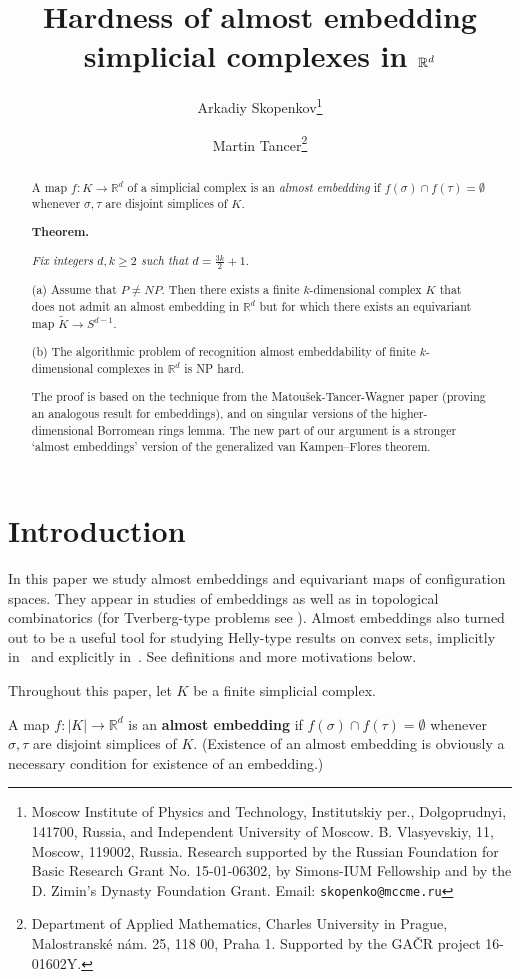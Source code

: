 \documentclass[runningheads]{llncs}
\title{Hardness of almost embedding simplicial complexes in $\R^d$
}
\author{Arkadiy Skopenkov\thanks{Moscow Institute of Physics and Technology,
  Institutskiy per., Dolgoprudnyi, 141700, Russia,
  and Independent University of Moscow.
  B. Vlasy\-ev\-skiy, 11, Moscow, 119002, Russia. Research supported by the
  Russian Foundation for Basic Research Grant No. 15-01-06302, by Simons-IUM Fellowship and by the D. Zimin's Dynasty Foundation Grant.
  Email:
  \texttt{skopenko@mccme.ru}} \and Martin Tancer\thanks{
Department of Applied Mathematics, Charles University in Prague, Malostransk\'e n\'am. 25, 118 00,
Praha 1. Supported by the GA\v{C}R project 16-01602Y.
}}
\date{}
\newcommand{\red}[1]{\begingroup\color{red}#1\endgroup}
\theoremstyle{remark}
\theoremstyle{definition}
\newcommand{\R}{\mathbb{R}}
\def\t{\widetilde}
\begin{document}
\maketitle

\begin{abstract}
A map $f\colon K\to \R^d$ of a simplicial complex is an \emph{almost embedding} if $f(\sigma)\cap f(\tau)=\emptyset$ whenever $\sigma,\tau$ are disjoint simplices of $K$.

{\bf Theorem.} {\it Fix integers $d,k\ge2$ such that $d=\frac{3k}2+1$.

(a) Assume that $P\ne NP$.
Then there exists a finite $k$-dimensional complex $K$ that does not admit an almost embedding in $\R^d$ but for which there exists an equivariant map $\t K\to S^{d-1}$.

(b) The algorithmic problem of recognition almost embeddability of finite $k$-dimensional complexes in $\R^d$ is NP hard.}

The proof is based on the technique from the Matou\v{s}ek-Tancer-Wagner paper (proving an analogous result for
embeddings), and on singular versions of the higher-dimensional {B}orromean rings lemma. The new part of our argument is a stronger `almost embeddings' version of the generalized van Kampen--Flores theorem.
\end{abstract}

\tableofcontents





\section{Introduction}

In this paper we study almost embeddings and equivariant maps of configuration spaces.
They appear in studies of embeddings \cite{FKT, Sk08} as well as in topological
combinatorics (for Tverberg-type problems see \cite{BZ, BBZ, Sk16}).
Almost embeddings also turned out to be a useful tool for studying Helly-type
results on convex sets, implicitly in~\cite{Ma97} and explicitly
in~\cite{GoPaPaTaWa15}. See definitions and more motivations below.

Throughout this paper, let $K$ be a finite simplicial complex.

A map  $f\colon |K|\to \R^d$ is an {\bf almost embedding} if $f(\sigma)\cap f(\tau)=\emptyset$
whenever $\sigma,\tau$ are disjoint simplices of $K$.
(Existence of an almost embedding is obviously a necessary condition for existence of an embedding.)
\end{document}

